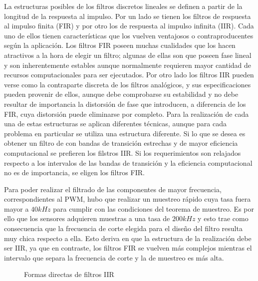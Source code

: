 La estructuras posibles de los filtros discretos lineales se definen a partir de la longitud de la respuesta al impulso. Por un lado se tienen los filtros de respuesta
al impulso finita (FIR) y por otro los de respuesta al impulso infinita (IIR). Cada uno de ellos tienen características que los vuelven ventajosos o contraproducentes
según la aplicación. Los filtros FIR poseen muchas cualidades que los hacen atractivos a la hora de elegir un filtro; algunas de ellas son que poseen fase lineal y son
inherentemente estables aunque normalmente requieren mayor cantidad de recursos computacionales para ser ejecutados. Por otro lado los filtros IIR pueden verse como
la contraparte discreta de los filtros analógicos, y sus especificaciones pueden provenir de ellos, aunque debe comprobarse su estabilidad y no debe resultar de importancia
la distorsión de fase que introducen, a diferencia de los FIR, cuya distorsión puede eliminarse por completo. Para la realización de cada una de estas estructuras
se aplican diferentes técnicas, aunque para cada problema en particular se utiliza una estructura diferente. Si lo que se desea es obtener un filtro de con bandas de
transición estrechas y de mayor eficiencia computacional se prefieren los filstros IIR. Si los requerimientos son relajados respecto a los intervalos de las bandas de transición
y la eficiencia computacional no es de importancia, se eligen los filtros FIR.

Para poder realizar el filtrado de las componentes de mayor frecuencia, correspondientes al PWM, hubo que realizar un muestreo rápido cuya tasa fuera mayor a $40kHz$
para cumplir con las condiciones del teorema de muestreo. Es por ello que los sensores adquieren muestras a una tasa de $200kHz$ y esto trae como consecuencia que la
frecuencia de corte elegida para el diseño del filtro resulta muy chica respecto a ella. Esto deriva en que la estructura de la realización debe ser IIR, ya que en
contraste, los filtros FIR se vuelven más complejos mientras el intervalo que separa la frecuencia de corte y la de muestreo es más alta.

\begin{figure}[H]
 \centering
  \quad
 \caption{Formas directas de filtros IIR}
 \label{fig:forma_directa}
\end{figure}

